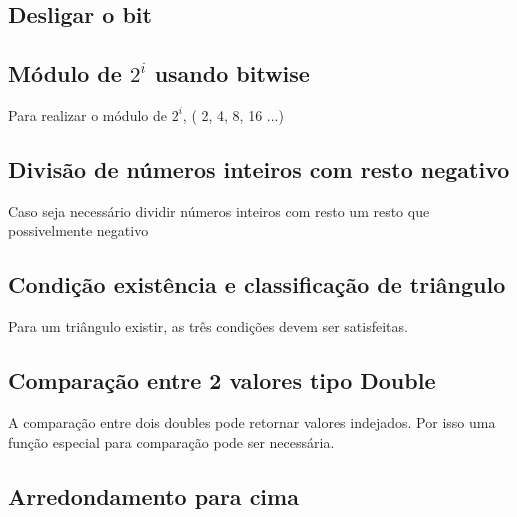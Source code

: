 \documentclass[a4paper,12pt]{article}
\begin{document}
\subsection{Desligar o bit}

\subsection{Módulo de $2^{i}$ usando bitwise}
Para realizar o módulo de $2^{i}$, ( 2, 4, 8, 16 ...)


\subsection{Divisão de números inteiros com resto negativo}

Caso seja necessário dividir números inteiros com resto um resto que possivelmente negativo


\subsection{Condição existência e classificação de triângulo}

Para um triângulo existir, as três condições devem ser satisfeitas.


\subsection{Comparação entre 2 valores tipo Double}

A comparação entre dois doubles pode retornar valores indejados. Por isso uma função especial para comparação pode ser necessária.


\subsection{Arredondamento para cima}

\end{document}
